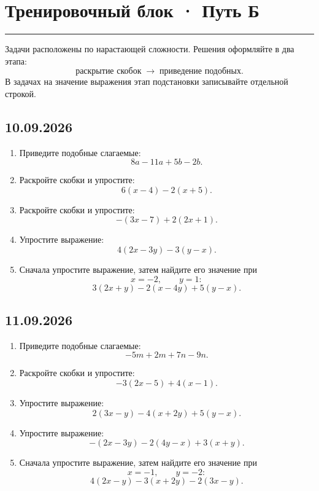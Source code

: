 \documentclass[a4paper,12pt]{article}
\newcommand{\topicline}{\par\noindent\color{accent}\rule{\linewidth}{0.6pt}\color{black}\par}
\begin{document}
\section*{Тренировочный блок · Путь Б}
\topicline
Задачи расположены по нарастающей сложности. Решения оформляйте в два этапа:
\[
\text{раскрытие скобок}\;\longrightarrow\;\text{приведение подобных}.
\]
В задачах на значение выражения этап подстановки записывайте отдельной строкой.

\subsection*{10.09.2026}
\begin{enumerate}[label=\textbf{\arabic*.}]
\item Приведите подобные слагаемые: \[8a-11a+5b-2b.\]
\item Раскройте скобки и упростите: \[6(x-4)-2(x+5).\]
\item Раскройте скобки и упростите: \[-(3x-7)+2(2x+1).\]
\item Упростите выражение: \[4(2x-3y)-3(y-x).\]
\item Сначала упростите выражение, затем найдите его значение при \[x=-2,\qquad y=1:\] \[3(2x+y)-2(x-4y)+5(y-x).\]
\end{enumerate}

\subsection*{11.09.2026}
\begin{enumerate}[label=\textbf{\arabic*.},resume]
\item Приведите подобные слагаемые: \[-5m+2m+7n-9n.\]
\item Раскройте скобки и упростите: \[-3(2x-5)+4(x-1).\]
\item Упростите выражение: \[2(3x-y)-4(x+2y)+5(y-x).\]
\item Упростите выражение: \[-(2x-3y)-2(4y-x)+3(x+y).\]
\item Сначала упростите выражение, затем найдите его значение при \[x=-1,\qquad y=-2:\] \[4(2x-y)-3(x+2y)-2(3x-y).\]
\end{enumerate}

\clearpage
\end{document}
